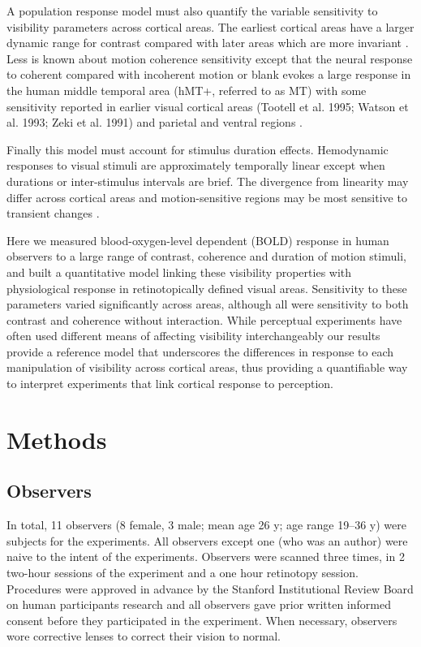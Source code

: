 \documentclass{report}
\begin{document}
A population response model must also quantify the variable sensitivity to visibility parameters across cortical areas. The earliest cortical areas have a larger dynamic range for contrast compared with later areas which are more invariant \citep{Avidan2002-jg,Cheng1994-ic,Rolls1986-wr,Sclar1990-lk}. Less is known about motion coherence sensitivity except that the neural response to coherent compared with incoherent motion or blank evokes a large response in the human middle temporal area (hMT+, referred to as MT) with some sensitivity reported in earlier visual cortical areas \citep{Ajina2015-xm,Costagli2014-kg,Dupont1994-yi,Heeger1999-ii} (Tootell et al. 1995; Watson et al. 1993; Zeki et al. 1991) and parietal and ventral regions \citep{Braddick2001-pp}.

Finally this model must account for stimulus duration effects. Hemodynamic responses to visual stimuli are approximately temporally linear except when durations \citep{Boynton1996-ff,Boynton2012-xy} or inter-stimulus intervals \citep{Huettel2000-ji} are brief. The divergence from linearity may differ across cortical areas \citep{Birn2001-tp} and motion-sensitive regions may be most sensitive to transient changes \citep{Stigliani2017-oe}.

Here we measured blood-oxygen-level dependent (BOLD) \citep{Ogawa1990-er} response in human observers to a large range of contrast, coherence and duration of motion stimuli, and built a quantitative model linking these visibility properties with physiological response in retinotopically defined visual areas. Sensitivity to these parameters varied significantly across areas, although all were sensitivity to both contrast and coherence without interaction. While perceptual experiments have often used different means of affecting visibility interchangeably our results provide a reference model that underscores the differences in response to each manipulation of visibility across cortical areas, thus providing a quantifiable way to interpret experiments that link cortical response to perception.

\section{Methods}
\subsection{Observers}

In total, 11 observers (8 female, 3 male; mean age 26 y; age range 19–36 y) were subjects for the experiments. All observers except one (who was an author) were naive to the intent of the experiments. Observers were scanned three times, in 2 two-hour sessions of the experiment and a one hour retinotopy session. Procedures were approved in advance by the Stanford Institutional Review Board on human participants research and all observers gave prior written informed consent before they participated in the experiment. When necessary, observers wore corrective lenses to correct their vision to normal.
\end{document}
